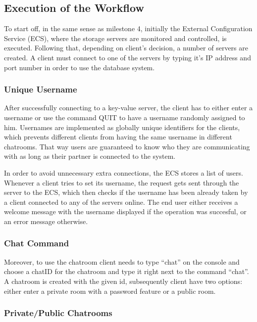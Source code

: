\subsection{Execution of the Workflow}
\label{sec:groupchat_executionoftheworkflow}

To start off, in the same sense as milestone 4, initially the External Configuration Service (ECS), where the storage servers are monitored and controlled, is executed. Following that, depending on client's decision, a number of servers are created. A client must connect to one of the servers by typing it's IP address and port number in order to use the database system.

\subsubsection{Unique Username}
\label{sec:groupchat_executionoftheworkflow_uniqueusername}
After successfully connecting to a key-value server, the client has to either enter a username or use the command QUIT to have a username randomly assigned to him. Usernames are implemented as globally unique identifiers for the clients, which prevents different clients from having the same username in different chatrooms. That way users are guaranteed to know who they are communicating with as long as their partner is connected to the system. 

In order to avoid unnecessary extra connections, the ECS stores a list of users. Whenever a client tries to set its username, the request gets sent through the server to the ECS, which then checks if the username has been already taken by a client connected to any of the servers online. The end user either receives a welcome message with the username displayed if the operation was succesful, or an error message otherwise.
 
\subsubsection{Chat Command}
\label{sec:groupchat_executionoftheworkflow_chatcommand}

Moreover, to use the chatroom client needs to type “chat” on the console and choose a chatID for the chatroom and type it right next to the command “chat”. A chatroom is created with the given id, subsequently client have two options: either enter a private room with a password feature or a public room. 
\subsubsection{Private/Public Chatrooms}
\label{sec:groupchat_executionoftheworkflow_chatrooms}

